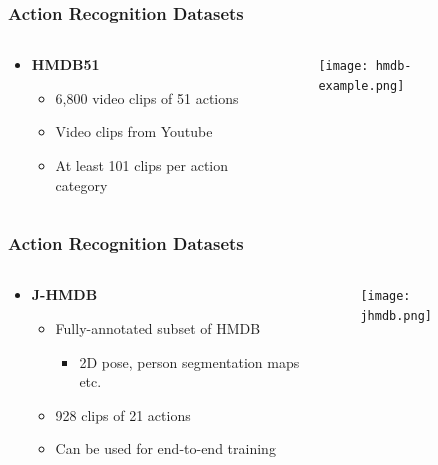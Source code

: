 \documentclass[9pt]{beamer}
\providecommand{\source}{\\ \footnotesize \tugreen{Source:} \footnotemark}
\newenvironment{myframe}[1][]{%
\begin{frame}%
\frametitle{#1}
\setcounter{footnote}{0}


}{%
\end{frame}%
}
\begin{document}
\begin{myframe}[Action Recognition Datasets]
  \begin{columns}[T]
      \begin{column}{.48\textwidth}
          \begin{itemize}
              \item \textbf{HMDB51\footnotemark}
              \begin{itemize}
                  \item 6,800 video clips of 51 actions
                  \item Video clips from Youtube
                  \item At least 101 clips per action category
              \end{itemize}
          \end{itemize}
      \end{column}
      \begin{column}{.48\textwidth}
          \begin{figure}
              \texttt{[image: hmdb-example.png]}
              \source
          \end{figure}
      \end{column}
  \end{columns}
\end{myframe}

\begin{myframe}[Action Recognition Datasets]
  \begin{columns}[T]
      \begin{column}{.48\textwidth}
          \begin{itemize}
              \item \textbf{J-HMDB\footnotemark}
              \begin{itemize}
                  \item Fully-annotated subset of HMDB
                  \begin{itemize}
                      \item 2D pose, person segmentation maps etc.
                  \end{itemize}
                  \item 928 clips of 21 actions
                  \item Can be used for end-to-end training
              \end{itemize}
          \end{itemize}
      \end{column}
      \begin{column}{.48\textwidth}
          \begin{figure}
              \texttt{[image: jhmdb.png]}
              \centering
              \source
          \end{figure}
      \end{column}
  \end{columns}
\end{myframe}
\end{document}
